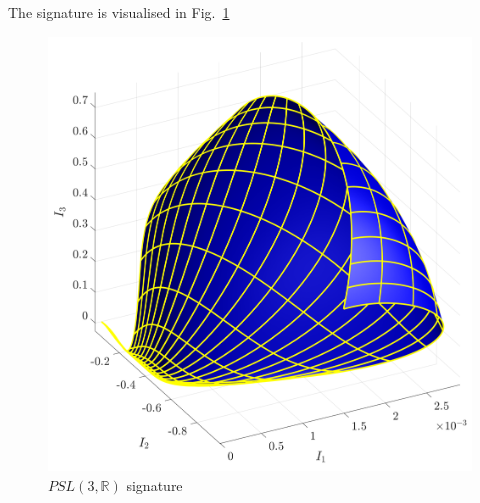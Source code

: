 \documentclass[11pt]{article}
\begin{document}
The signature is visualised in Fig.~\ref{fig:psl3rsignature}
\begin{figure}
  \centering
    \includegraphics[width=12cm]{figures/PSL3R_signature}
    \caption{$PSL(3, \mathbb{R})$ signature}
  \label{fig:psl3rsignature}
\end{figure}
\end{document}
